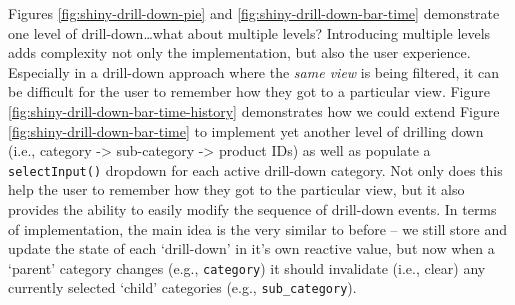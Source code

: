 \documentclass[
  12pt,
]{krantz}
\begin{document}
Figures \ref{fig:shiny-drill-down-pie} and \ref{fig:shiny-drill-down-bar-time} demonstrate one level of drill-down\ldots what about multiple levels? Introducing multiple levels adds complexity not only the implementation, but also the user experience. Especially in a drill-down approach where the \emph{same view} is being filtered, it can be difficult for the user to remember how they got to a particular view. Figure \ref{fig:shiny-drill-down-bar-time-history} demonstrates how we could extend Figure \ref{fig:shiny-drill-down-bar-time} to implement yet another level of drilling down (i.e., category -\textgreater{} sub-category -\textgreater{} product IDs) as well as populate a \texttt{selectInput()} dropdown for each active drill-down category. Not only does this help the user to remember how they got to the particular view, but it also provides the ability to easily modify the sequence of drill-down events. In terms of implementation, the main idea is the very similar to before -- we still store and update the state of each `drill-down' in it's own reactive value, but now when a `parent' category changes (e.g., \texttt{category}) it should invalidate (i.e., clear) any currently selected `child' categories (e.g., \texttt{sub\_category}).
\end{document}
